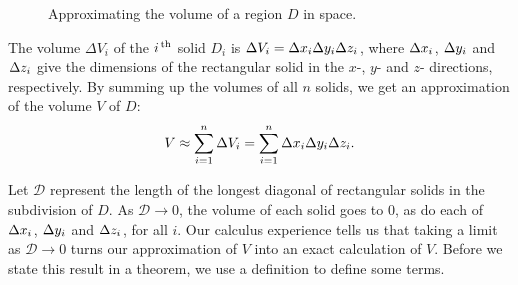 \begin{figure}[h]
\centering
\qquad
{}
\caption{Approximating the volume of a region $D$ in space.}
\end{figure}


The volume $\Delta V_i$ of the $i^\text{\,th}$ solid $D_i$ is $\Delta V_i = \Delta x_i\Delta y_i\Delta z_i$, where $\Delta x_i$, $\Delta y_i$ and $\Delta z_i$ give the dimensions of the rectangular solid in the $x$-, $y$- and $z$- directions, respectively. By summing up the volumes of all $n$ solids, we get an approximation of the volume $V$ of $D$:
$$V \approx \sum_{i=1}^n \Delta V_i = \sum_{i=1}^n \Delta x_i\Delta y_i\Delta z_i.$$

Let $\mathcal{D}$ represent the length of the longest diagonal of rectangular solids in the subdivision of $D$. As $\mathcal{D}\to 0$, the volume of each solid goes to 0, as do each of $\Delta x_i$, $\Delta y_i$ and $\Delta z_i$, for all $i$. Our calculus experience tells us that taking a limit as $\mathcal{D}\to 0$ turns our approximation of $V$ into an exact calculation of $V$. Before we state this result in a theorem, we use a definition to define some terms.




